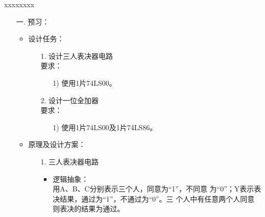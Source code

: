 \documentclass[UTF8]{ctexart}
\begin{document}
\centering
xxxxxxxx \\
\newpage
\begin{enumerate}
    \large
    \vspace{1\baselineskip}
    \item[一.]  预习：
          \begin{itemize}
              \item 设计任务：
                    \begin{itemize}
                        \item [1.] 设计三人表决器电路\\
                              要求：
                              \begin{itemize}
                                  \item [1)] 使用1片74LS00。

                              \end{itemize}
                        \item [2.] 设计一位全加器\\
                              要求：
                              \begin{itemize}
                                  \item [1)] 使用1片74LS00及1片74LS86。

                              \end{itemize}
                    \end{itemize}
              \item 原理及设计方案：\\
                    \begin{itemize}
                        \item[1.] 三人表决器电路\\
                              \begin{itemize}
                                  \item 逻辑抽象：\\
                                        用A、B、C分别表示三个人，同意为“1”，不同意
                                        为“0”；Y表示表决结果，通过为“1”，不通过为“0”。三
                                        个人中有任意两个人同意则表决的结果为通过。\\


\end{itemize}
\end{itemize}
\end{itemize}
\end{enumerate}
\end{document}
